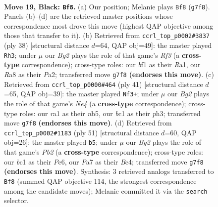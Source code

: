 \documentclass[11pt]{article}
\begin{document}
\clearpage

\begin{figure}[p]\centering
\begin{subfigure}{0.46\textwidth}\centering
\resizebox{\linewidth}{!}{%
\newchessgame
\chessboard[
  setfen={rk5r/pp4bp/5p2/4pP2/PPP2P2/2n5/8/R1B1KB1R b KQ - 0 19},
  showmover=false,
  pgfstyle=straightmove, color=movearrow, markmove={g7-f8}
]}
\caption{}
\end{subfigure}\hfill
\begin{subfigure}{0.46\textwidth}\centering
\resizebox{\linewidth}{!}{%
\newchessgame
\chessboard[
  setfen={r3r1k1/pp2b2p/5p2/2p1Pp2/5P2/4BR2/P1P3PP/R5K1 w - - 0 20},
  showmover=false,
  pgfstyle=straightmove, color=movearrow, markmove={f3-h3}
]}
\caption{}
\end{subfigure}
\\[4pt]
\begin{subfigure}{0.46\textwidth}\centering
\resizebox{\linewidth}{!}{%
\newchessgame
\chessboard[
  setfen={3rr1k1/1p4pp/3p4/1N2nP2/4n3/2P1P2P/P4P2/R1BR2K1 b - - 0 21},
  showmover=false,
  pgfstyle=straightmove, color=movearrow, markmove={e5-f3}
]}
\caption{}
\end{subfigure}\hfill
\begin{subfigure}{0.46\textwidth}\centering
\resizebox{\linewidth}{!}{%
\newchessgame
\chessboard[
  setfen={r2r2k1/1p3ppp/2p5/8/p1bPPP2/P6P/2BR2P1/2R3K1 b - - 4 26},
  showmover=false,
  pgfstyle=straightmove, color=movearrow, markmove={b7-b5}
]}
\caption{}
\end{subfigure}
\caption{\textbf{Move 19, Black: \texttt{Bf8}.} (a) Our position; Melanie plays \texttt{Bf8} (\texttt{g7f8}). Panels (b)--(d) are the retrieved master positions whose correspondence most drove this move (highest QAP objective among those that transfer to it). (b) Retrieved from \texttt{ccrl\_top\_p0002\#3837} (ply 38) [structural distance $d$=64, QAP obj=49]: the master played \texttt{Rh3}; under $\mu$ our \emph{Bg2} plays the role of that game's \emph{Rf3} (a \textbf{cross-type} correspondence); cross-type roles: our \emph{b}f1 as their \emph{R}a1, our \emph{R}a8 as their \emph{P}a2; transferred move \texttt{g7f8} \textbf{(endorses this move)}. (c) Retrieved from \texttt{ccrl\_top\_p0000\#464} (ply 41) [structural distance $d$=65, QAP obj=39]: the master played \texttt{Nf3+}; under $\mu$ our \emph{Bg2} plays the role of that game's \emph{Ne4} (a \textbf{cross-type} correspondence); cross-type roles: our \emph{r}a1 as their \emph{n}b5, our \emph{b}c1 as their \emph{p}h3; transferred move \texttt{g7f8} \textbf{(endorses this move)}. (d) Retrieved from \texttt{ccrl\_top\_p0002\#1183} (ply 51) [structural distance $d$=60, QAP obj=26]: the master played \texttt{b5}; under $\mu$ our \emph{Bg2} plays the role of that game's \emph{Pb2} (a \textbf{cross-type} correspondence); cross-type roles: our \emph{b}c1 as their \emph{P}c6, our \emph{P}a7 as their \emph{B}c4; transferred move \texttt{g7f8} \textbf{(endorses this move)}. Synthesis: 3 retrieved analogs transferred to \texttt{Bf8} (summed QAP objective 114, the strongest correspondence among the candidate moves); Melanie committed it via the \texttt{search} selector.}
\label{fig:thought-m37}
\end{figure}
\end{document}
